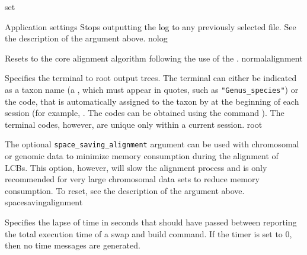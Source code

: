 \begin{command}{set}{}
\begin{arguments}
\begin{argumentgroup}{Application settings}
                {Stops outputting the log to any previously selected
                file. See the description of the argument 
                above.}
                {nolog}
            
                {Resets to the core alignment algorithm following the use of 
                the .}
                {normalalignment}
                
                {Specifies the terminal to root output trees.
                 The terminal can either be indicated as a taxon name (a
                \poystring, which must appear in quotes, such as
                \texttt{"Genus\_species"}) or the code, that is automatically
                assigned to the taxon by \poy at the beginning of each \poy
                session (for example, . The codes can
                be obtained using the command ).  The
                terminal codes, however, are unique only within a current
                session.}
                {root}
              
                {The optional \texttt {space\_saving\_alignment} argument can be
                used with chromosomal or genomic data to minimize memory
                consumption during the alignment of LCBs.  This option, however,
                will slow the alignment process and is only recommended for very
                large chromosomal data sets to reduce memory consumption. To
                reset, see the description of the argument
                 above.}
                {spacesavingalignment}
                        
                {Specifies the lapse of time in seconds that should have passed
                between reporting the total execution time of a swap and build
                command. If the timer is set to 0, then no time messages are
                generated.}{}
                
  

\end{argumentgroup}
\end{arguments}
\end{command}
